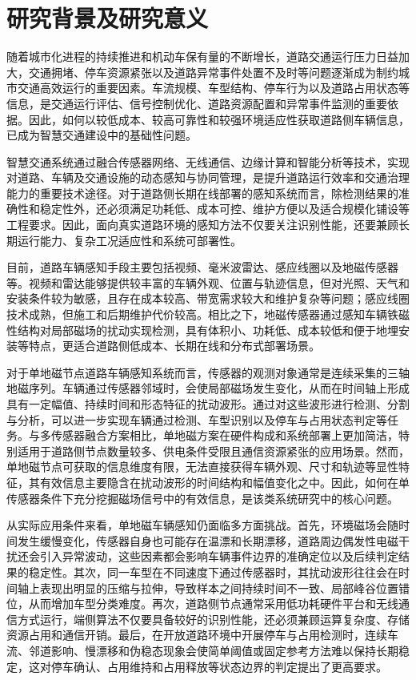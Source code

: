 

\section{研究背景及研究意义}
\label{sec:intro_background}

随着城市化进程的持续推进和机动车保有量的不断增长，道路交通运行压力日益加大，交通拥堵、停车资源紧张以及道路异常事件处置不及时等问题逐渐成为制约城市交通高效运行的重要因素。车流规模、车型结构、停车行为以及道路占用状态等信息，是交通运行评估、信号控制优化、道路资源配置和异常事件监测的重要依据。因此，如何以较低成本、较高可靠性和较强环境适应性获取道路侧车辆信息，已成为智慧交通建设中的基础性问题。

智慧交通系统通过融合传感器网络、无线通信、边缘计算和智能分析等技术，实现对道路、车辆及交通设施的动态感知与协同管理，是提升道路运行效率和交通治理能力的重要技术途径。对于道路侧长期在线部署的感知系统而言，除检测结果的准确性和稳定性外，还必须满足功耗低、成本可控、维护方便以及适合规模化铺设等工程要求。因此，面向真实道路环境的感知方法不仅要关注识别性能，还要兼顾长期运行能力、复杂工况适应性和系统可部署性。

目前，道路车辆感知手段主要包括视频、毫米波雷达、感应线圈以及地磁传感器等。视频和雷达能够提供较丰富的车辆外观、位置与轨迹信息，但对光照、天气和安装条件较为敏感，且存在成本较高、带宽需求较大和维护复杂等问题；感应线圈技术成熟，但施工和后期维护代价较高。相比之下，地磁传感器通过感知车辆铁磁性结构对局部磁场的扰动实现检测，具有体积小、功耗低、成本较低和便于地埋安装等特点，更适合道路侧低成本、长期在线和分布式部署场景。

对于单地磁节点道路车辆感知系统而言，传感器的观测对象通常是连续采集的三轴地磁序列。车辆通过传感器邻域时，会使局部磁场发生变化，从而在时间轴上形成具有一定幅值、持续时间和形态特征的扰动波形。通过对这些波形进行检测、分割与分析，可以进一步实现车辆通过检测、车型识别以及停车与占用状态判定等任务。与多传感器融合方案相比，单地磁方案在硬件构成和系统部署上更加简洁，特别适用于道路侧节点数量较多、供电条件受限且通信资源紧张的应用场景。然而，单地磁节点可获取的信息维度有限，无法直接获得车辆外观、尺寸和轨迹等显性特征，其有效信息主要隐含在扰动波形的时间结构和幅值变化之中。因此，如何在单传感器条件下充分挖掘磁场信号中的有效信息，是该类系统研究中的核心问题。

从实际应用条件来看，单地磁车辆感知仍面临多方面挑战。首先，环境磁场会随时间发生缓慢变化，传感器自身也可能存在温漂和长期漂移，道路周边偶发性电磁干扰还会引入异常波动，这些因素都会影响车辆事件边界的准确定位以及后续判定结果的稳定性。其次，同一车型在不同速度下通过传感器时，其扰动波形往往会在时间轴上表现出明显的压缩与拉伸，导致样本之间持续时间不一致、局部峰谷位置错位，从而增加车型分类难度。再次，道路侧节点通常采用低功耗硬件平台和无线通信方式运行，端侧算法不仅要具备较好的识别性能，还必须兼顾运算复杂度、存储资源占用和通信开销。最后，在开放道路环境中开展停车与占用检测时，连续车流、邻道影响、慢漂移和伪稳态现象会使简单阈值或固定参考方法难以保持长期稳定，这对停车确认、占用维持和占用释放等状态边界的判定提出了更高要求。

